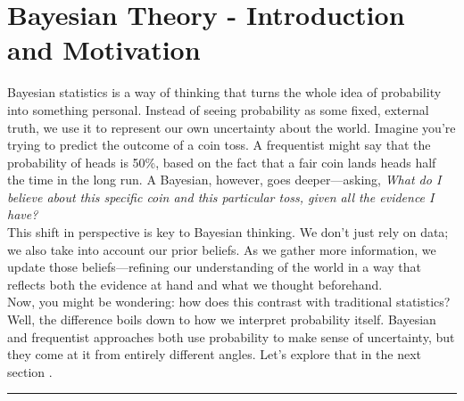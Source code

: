 \chapter{Bayesian Theory - Introduction and Motivation}

Bayesian statistics is a way of thinking that turns the whole idea of probability into something personal. Instead of seeing probability as some fixed, external truth, we use it to represent our own uncertainty about the world. Imagine you're trying to predict the outcome of a coin toss. A frequentist might say that the probability of heads is 50\%, based on the fact that a fair coin lands heads half the time in the long run. A Bayesian, however, goes deeper—asking, \textit{What do I believe about this specific coin and this particular toss, given all the evidence I have?}\\

This shift in perspective is key to Bayesian thinking. We don’t just rely on data; we also take into account our prior beliefs. As we gather more information, we update those beliefs—refining our understanding of the world in a way that reflects both the evidence at hand and what we thought beforehand.\\

Now, you might be wondering: how does this contrast with traditional statistics? Well, the difference boils down to how we interpret probability itself. Bayesian and frequentist approaches both use probability to make sense of uncertainty, but they come at it from entirely different angles. Let’s explore that in the next section  \cite{introtobayesianthinking}.



\vspace{20pt}
\hrule